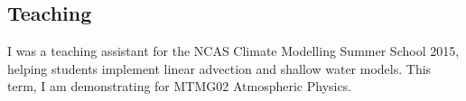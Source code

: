 \documentclass[a4paper]{article}
\begin{document}
\subsection{Teaching}
I was a teaching assistant for the NCAS Climate Modelling Summer School 2015, helping students implement linear advection and shallow water models.  This term, I am demonstrating for MTMG02 Atmospheric Physics.

                                                 

\end{document}
